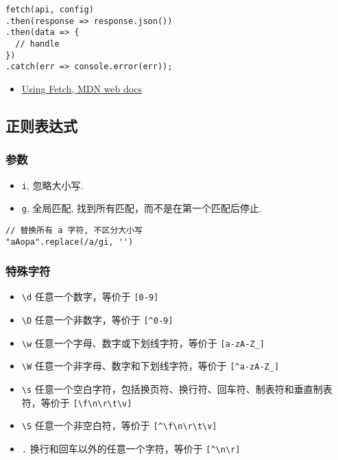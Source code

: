 \begin{lstlisting}
fetch(api, config)
.then(response => response.json())
.then(data => {
  // handle
})
.catch(err => console.error(err));
\end{lstlisting}

\begin{itemize}
\tightlist
\item
  \href{https://developer.mozilla.org/en-US/docs/Web/API/Fetch_API/Using_Fetch}{Using
  Fetch, MDN web docs}
\end{itemize}

\subsection{正则表达式}\label{ux6b63ux5219ux8868ux8fbeux5f0f}

\subsubsection{参数}\label{ux53c2ux6570}

\begin{itemize}
\tightlist
\item
  \lstinline!i!, 忽略大小写.
\item
  \lstinline!g!, 全局匹配, 找到所有匹配，而不是在第一个匹配后停止.
\end{itemize}

\begin{lstlisting}
// 替换所有 a 字符, 不区分大小写
"aAopa".replace(/a/gi, '')
\end{lstlisting}

\subsubsection{特殊字符}\label{ux7279ux6b8aux5b57ux7b26}

\begin{itemize}
\tightlist
\item
  \lstinline!\d! 任意一个数字，等价于 \lstinline![0-9]!
\item
  \lstinline!\D! 任意一个非数字，等价于 \lstinline![^0-9]!
\item
  \lstinline!\w! 任意一个字母、数字或下划线字符，等价于
  \lstinline![a-zA-Z_]!
\item
  \lstinline!\W! 任意一个非字母、数字和下划线字符，等价于
  \lstinline![^a-zA-Z_]!
\item
  \lstinline!\s!
  任意一个空白字符，包括换页符、换行符、回车符、制表符和垂直制表符，等价于
  \lstinline![\f\n\r\t\v]!
\item
  \lstinline!\S! 任意一个非空白符，等价于 \lstinline![^\f\n\r\t\v]!
\item
  \lstinline!.! 换行和回车以外的任意一个字符，等价于 \lstinline![^\n\r]!
\end{itemize}

